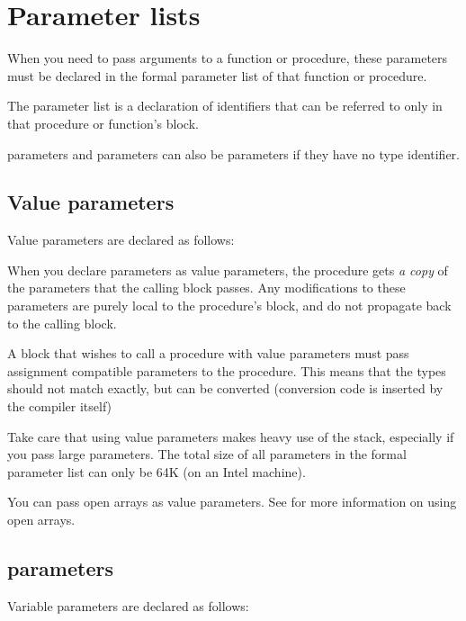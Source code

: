 \documentclass{report}
\begin{document}


\section{Parameter lists}
\label{se:Parameters}

When you need to pass arguments to a function or procedure, these parameters
must be declared in the formal parameter list of that function or procedure.

The parameter list is a declaration of identifiers that can be referred to 
only in that procedure or function's block.



 parameters and  parameters can also be 
parameters if they have no type identifier.

\subsection{Value parameters}

Value parameters are declared as follows:



When you declare parameters as value parameters, the procedure gets {\em 
a copy} of the parameters that the calling block passes. Any modifications
to these parameters are purely local to the procedure's block, and do not 
propagate back to the calling block.

A block that wishes to call a procedure with value parameters must pass
assignment compatible parameters to the procedure. This means that the types
should not match exactly, but can be converted (conversion code is inserted
by the compiler itself)

Take care that using value parameters makes heavy use of the stack,
especially if you pass large parameters. The total size of all parameters in
the formal parameter list can only be 64K (on an Intel machine).

You can pass open arrays as value parameters. See  for
more information on using open arrays.

\subsection{ parameters}
\label{se:varparams}

Variable parameters are declared as follows:
\end{document}
